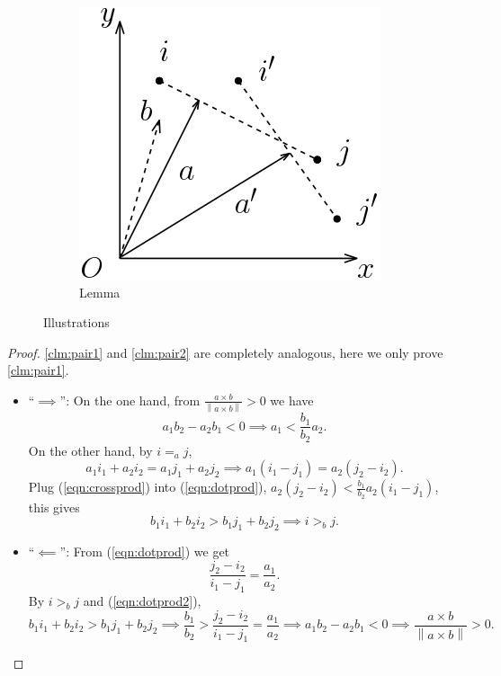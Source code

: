 \documentclass[12pt]{article}
\newcommand{\norm}[1]{\left\lVert{#1}\right\rVert}
\newcommand{\1}[1]{\mathds{1}[{#1}]}
\begin{document}
\begin{figure}
\begin{subfigure}[b]{0.25\textwidth}
        \includegraphics[width=\textwidth]{lemma1}
        \caption{Lemma}
        \label{fig:lemma1}
    \end{subfigure}
    \vspace{20pt}
    \caption{Illustrations}
\end{figure}

\begin{proof}
\ref{clm:pair1} and \ref{clm:pair2} are completely analogous, here we only prove \ref{clm:pair1}.
\begin{itemize}
	\item ``$\implies$'':
	On the one hand, from $\frac{a \times b}{\norm{a \times b}} > 0$ we have
	\begin{equation} \label{eqn:crossprod}
		a_1 b_2 - a_2 b_1 < 0 \implies a_1 < \frac{b_1}{b_2} a_2.
	\end{equation}
	On the other hand, by $i =_a j$,
	\begin{equation} \label{eqn:dotprod}
		a_1 i_1 + a_2 i_2 = a_1 j_1 + a_2 j_2 
		\implies a_1 (i_1 - j_1) = a_2 (j_2 - i_2).
	\end{equation}
	Plug (\ref{eqn:crossprod}) into (\ref{eqn:dotprod}), $a_2 (j_2 - i_2) < \frac{b_1}{b_2} a_2 (i_1 - j_1)$, this gives
	\[
		b_1 i_1 + b_2 i_2 > b_1 j_1 + b_2 j_2
		\implies i >_b j.
	\]

	\item ``$\impliedby$'':
	From (\ref{eqn:dotprod}) we get
	\begin{equation} \label{eqn:dotprod2}
		\frac{j_2 - i_2}{i_1 - j_1} = \frac{a_1}{a_2}.
	\end{equation}
	By $i >_b j$ and (\ref{eqn:dotprod2}),
	\[
		b_1 i_1 + b_2 i_2 > b_1 j_1 + b_2 j_2
		\implies \frac{b_1}{b_2} > \frac{j_2 - i_2}{i_1 - j_1} = \frac{a_1}{a_2}
		\implies a_1 b_2 - a_2 b_1 < 0
		\implies \frac{a \times b}{\norm{a \times b}} > 0.
	\]
\end{itemize}
\end{proof}
\end{document}
